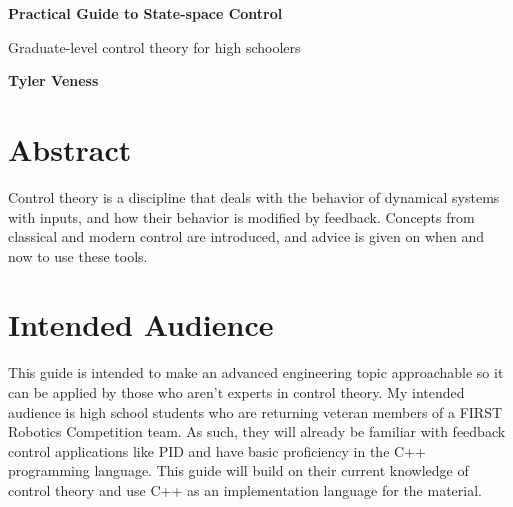 \documentclass[10pt,conference,compsoc]{IEEEtran}
\begin{document}


\begin{titlepage}
  \begin{center}
    \vspace*{1cm}

    \Huge
    \textbf{Practical Guide to State-space Control}

    \vspace{0.5cm}
    \LARGE
    Graduate-level control theory for high schoolers

    \vspace{1.5cm}

    \textbf{Tyler Veness}

    \vfill

    \vspace{0.8cm}

  \end{center}

  \vfill

  \section{Abstract}

  \noindent Control theory is a discipline that deals with the behavior of
  dynamical systems with inputs, and how their behavior is modified by feedback.
  Concepts from classical and modern control are introduced, and advice is given
  on when and now to use these tools.

  \section{Intended Audience}

  \noindent This guide is intended to make an advanced engineering topic
  approachable so it can be applied by those who aren't experts in control
  theory. My intended audience is high school students who are returning veteran
  members of a FIRST Robotics Competition team. As such, they will already be
  familiar with feedback control applications like PID and have basic
  proficiency in the C++ programming language. This guide will build on their
  current knowledge of control theory and use C++ as an implementation language
  for the material.

  \vspace{0.8cm}
\end{titlepage}
\thispagestyle{empty}  %
\end{document}
